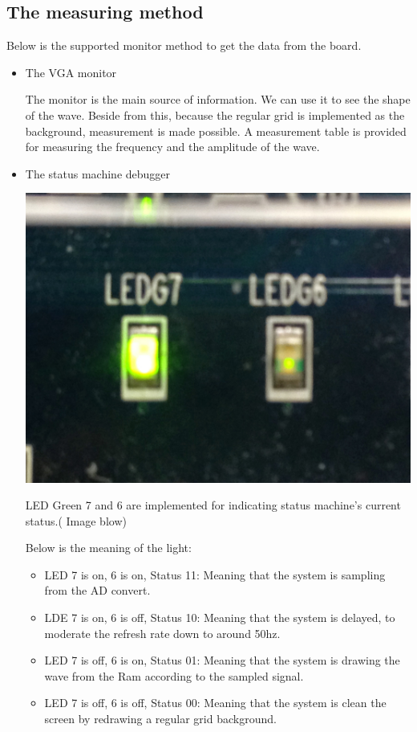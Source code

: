 \documentclass[11pt]{scrartcl}
\begin{document}
\subsection{The measuring method}
Below is the supported monitor method to get the data from the board.
\begin{itemize}
    \item The VGA monitor
    
    The monitor is the main source of information. We can use it to see the shape of the wave. Beside from this, because the regular grid is implemented as the background, measurement is made possible. A measurement table is provided for measuring the frequency and the amplitude of the wave. 
    \item The status machine debugger
    \begin{center}     
\begin{minipage}[t]{\linewidth}

{
\includegraphics[scale = 0.05]{IMG_1386.JPG}
}
\end{minipage}
\medskip
\end{center}

     LED Green 7 and 6 are implemented for indicating status machine's current status.( Image blow)

    
    Below is the meaning of the light:
    \begin{itemize}
        \item LED 7 is on, 6 is on, Status 11:
         Meaning that the system is sampling from the AD convert.
         \item LDE 7 is on, 6 is off, Status 10:
         Meaning that the system is delayed, to moderate the refresh rate down to around 50hz.
         \item LED 7 is off, 6 is on, Status 01:
         Meaning that the system is drawing the wave from the Ram according to the sampled signal.
         \item LED 7 is off, 6 is off, Status 00:
         Meaning that the system is clean the screen by redrawing a regular grid background.
         

\end{itemize}
\end{itemize}
\end{document}
